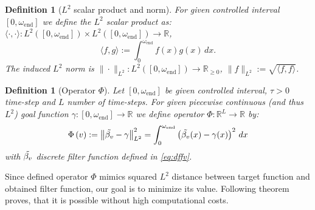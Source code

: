 \documentclass[a4paper,11pt,bibliography=totoc,listof=totoc,headinclude=true,cleardoublepage=empty,oneside]{scrbook}
\newtheorem{definition}[theorem]{Definition}
\newcommand{\R}{\mathbb{R}}
\newcommand{\e}{\mathrm{end}}
\begin{document}
\begin{definition}[$L^2$ scalar product and norm]
    For given controlled interval $[0, \omega_\e]$ we define the $L^2$ scalar product as: $\langle \cdot, \cdot \rangle : L^2\left([0, \omega_\e]\right) \times L^2\left([0, \omega_\e]\right) \rightarrow \R$, 
    \begin{equation*}
        \langle f, g\rangle := \int_0^{\omega_\e} f(x)g(x) \, dx.
    \end{equation*}
    The induced $L^2$ norm is $\| \cdot \|_{L^2}: L^2\left([0, \omega_\e]\right)  \rightarrow \R_{\geqslant 0}$, $\|f\|_{L^2} := \sqrt{\langle f, f \rangle}$.

\end{definition}
\begin{definition}[Operator $\Phi$]\label{def:Phi}
    Let $[0, \omega_\e]$ be given controlled interval, $\tau > 0$ time-step and $L$ number of time-steps. For given piecewise continuous (and thus $L^2$) goal function $\gamma : [0, \omega_\e] \rightarrow \R$ we define operator $\Phi :\R^L \rightarrow \R $ by:
    \begin{align*}
        \Phi\left(v\right) := \left\| \Tilde{\beta_v} - \gamma \right\|_{L^2}^2 = \int_0^{\omega_\e} \left(\Tilde{\beta_v}(x) - \gamma(x) \right)^2 \, dx
    \end{align*}
    with $\Tilde{\beta_v}$ discrete filter function defined in \eqref{eq:dffv}.
\end{definition} 

Since defined operator $\Phi$ mimics squared $L^2$ distance between target function and obtained filter function, our goal is to minimize its value. Following theorem proves, that it is possible without high computational costs. 
\end{document}
